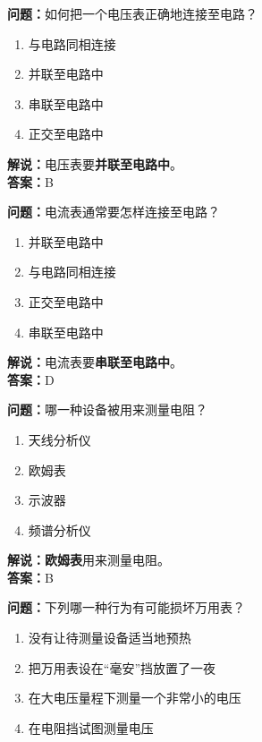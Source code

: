 \documentclass{ctexbook}
\begin{document}
\bigskip


\noindent\textbf{问题：}如何把一个电压表正确地连接至电路？

\begin{enumerate}[label=\Alph*), leftmargin=3em]
	\item 与电路同相连接
	\item 并联至电路中
	\item 串联至电路中
	\item 正交至电路中
\end{enumerate}

\noindent\textbf{解说：}电压表要\textbf{并联至电路中}。\\\noindent\textbf{答案：}B

\bigskip


\noindent\textbf{问题：}电流表通常要怎样连接至电路？

\begin{enumerate}[label=\Alph*), leftmargin=3em]
	\item 并联至电路中
	\item 与电路同相连接
	\item 正交至电路中
	\item 串联至电路中
\end{enumerate}

\noindent\textbf{解说：}电流表要\textbf{串联至电路中}。\\\noindent\textbf{答案：}D


\bigskip


\noindent\textbf{问题：}哪一种设备被用来测量电阻？

\begin{enumerate}[label=\Alph*), leftmargin=3em]
	\item 天线分析仪
	\item 欧姆表
	\item 示波器
	\item 频谱分析仪
\end{enumerate}

\noindent\textbf{解说：欧姆表}用来测量电阻。\\\noindent\textbf{答案：}B


\bigskip


\noindent\textbf{问题：}下列哪一种行为有可能损坏万用表？

\begin{enumerate}[label=\Alph*), leftmargin=3em]
	\item 没有让待测量设备适当地预热
	\item 把万用表设在“毫安”挡放置了一夜
	\item 在大电压量程下测量一个非常小的电压
	\item 在电阻挡试图测量电压
\end{enumerate}
\end{document}
